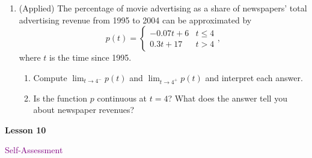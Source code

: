 \documentclass[10pt]{book}
\theoremstyle{definition}
\theoremstyle{remark}
\begin{document}
\begin{large}
\begin{enumerate}
\item (Applied) The percentage of movie advertising as a share of newspapers’ total advertising revenue from 1995 to 2004 can be approximated by \[p(t) = \begin{cases}-0.07t + 6 & t \leq 4\\ 0.3t + 17 & t>4 \end{cases}, \] where $t$ is the time since 1995.
\begin{enumerate}
	\item   Compute $\displaystyle\lim_{t \rightarrow 4^-} p(t)$ and $\displaystyle\lim_{t \rightarrow 4^+} p(t)$ and interpret each answer. 
	\item  Is the function $p$ continuous at $t = 4$? What does the answer tell you about newspaper revenues?
\end{enumerate} 
\end{enumerate}
\end{large}
\newpage


\begin{tcolorbox}[
  width=\textwidth,
  colback=gray!10, %
  colframe=white, %
  boxrule=0pt,    %
  left=1cm,       %
  right=1cm,      %
  sharp corners  %
]

\begin{minipage}[t]{0.5\textwidth}
  \Huge \textbf{Lesson 10}
\end{minipage}%
\hfill
\begin{minipage}[t]{0.5\textwidth}
  \Huge\textcolor{purple}{Self-Assessment}
\end{minipage}
\end{tcolorbox}
\end{document}
